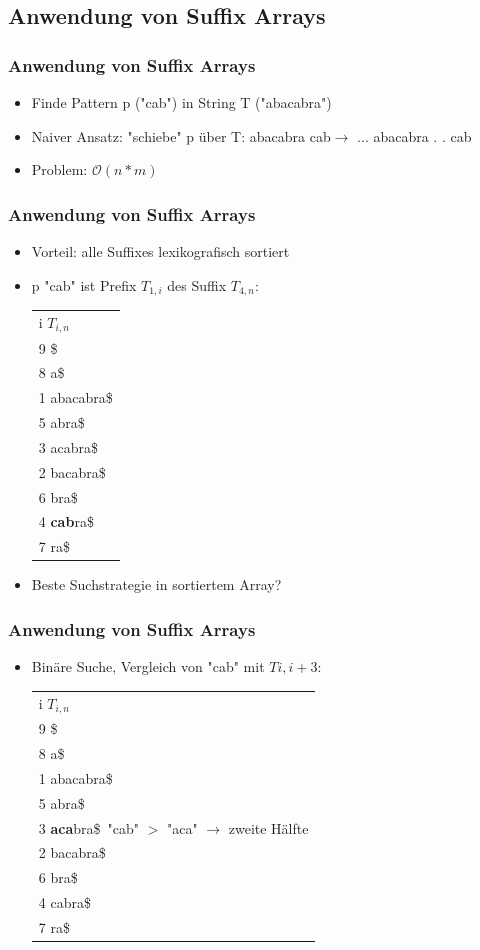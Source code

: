 \documentclass{beamer}
\begin{document}
\subsection{Anwendung von Suffix Arrays}
\begin{frame}
\frametitle{Anwendung von Suffix Arrays}
\begin{itemize}
\item Finde Pattern p ("cab") in String T ("abacabra")
\item Naiver Ansatz: "schiebe" p \"uber T: \newline
abacabra \newline
cab$\rightarrow$ \newline
...\newline
abacabra \newline
. . cab
\item Problem: ${ \scriptstyle \mathcal{O	}}(n*m)$
\end{itemize}
\end{frame}
\begin{frame}
\frametitle{Anwendung von Suffix Arrays}
\begin{itemize}
\item Vorteil: alle Suffixes lexikografisch sortiert
\item p "cab" ist Prefix $T_{1,i}$ des Suffix $T_{4,n}$: \newline
\begin{tabular}{l}
	i $T_{i,n}$\\
9 \$\\
8 a\$\\
1 abacabra\$\\
5 abra\$\\
3 acabra\$\\
2 bacabra\$\\
6 bra\$\\
4 \color{red}\textbf{cab}\color{black}ra\$\\
7 ra\$\\
	\end{tabular}
\item Beste Suchstrategie in sortiertem Array?
\end{itemize}
\end{frame}
\begin{frame}
\frametitle{Anwendung von Suffix Arrays}
\begin{itemize}
\item Bin\"are Suche, Vergleich von "cab" mit $T{i,i+3}$:\newline
\begin{tabular}{l}
	i $T_{i,n}$\\
9 \$\\
8 a\$\\
1 abacabra\$\\
5 abra\$\\
3 \color{red}\textbf{aca}\color{black}bra\$\ "cab" $>$ "aca" $\rightarrow$ zweite H\"alfte\\
2 bacabra\$\\
6 bra\$\\
4 cabra\$\\
7 ra\$\\
	\end{tabular}
\end{itemize}
\end{frame}
\end{document}
